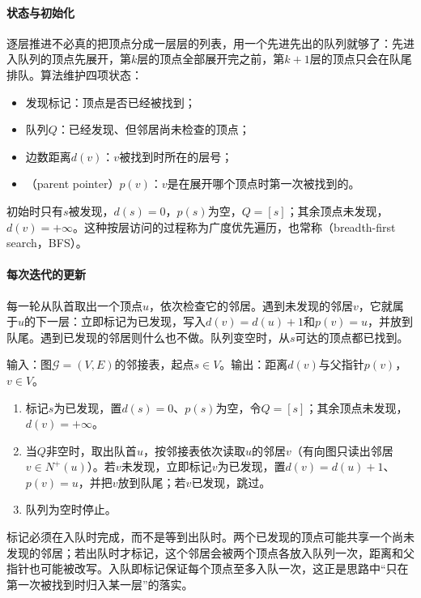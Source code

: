 \paragraph{状态与初始化}
逐层推进不必真的把顶点分成一层层的列表，用一个先进先出的队列就够了：先进入队列的顶点先展开，第$k$层的顶点全部展开完之前，第$k+1$层的顶点只会在队尾排队。算法维护四项状态：
\begin{itemize}
  \item 发现标记：顶点是否已经被找到；
  \item 队列$Q$：已经发现、但邻居尚未检查的顶点；
  \item 边数距离$d(v)$：$v$被找到时所在的层号；
  \item {}（parent pointer）$p(v)$：$v$是在展开哪个顶点时第一次被找到的。
\end{itemize}
初始时只有$s$被发现，$d(s)=0$，$p(s)$为空，$Q=[s]$；其余顶点未发现，$d(v)=+\infty$。这种按层访问的过程称为广度优先遍历，也常称（breadth-first search，BFS）。

\paragraph{每次迭代的更新}
每一轮从队首取出一个顶点$u$，依次检查它的邻居。遇到未发现的邻居$v$，它就属于$u$的下一层：立即标记为已发现，写入$d(v)=d(u)+1$和$p(v)=u$，并放到队尾。遇到已发现的邻居则什么也不做。队列变空时，从$s$可达的顶点都已找到。

\begin{algorithm}[广度优先遍历]
\label{alg:graph-trav-bfs}
输入：图$\mathcal G=(V,E)$的邻接表，起点$s\in V$。输出：距离$d(v)$与父指针$p(v)$，$v\in V$。
\begin{enumerate}
  \item 标记$s$为已发现，置$d(s)=0$、$p(s)$为空，令$Q=[s]$；其余顶点未发现，$d(v)=+\infty$。
  \item 当$Q$非空时，取出队首$u$，按邻接表依次读取$u$的邻居$v$（有向图只读出邻居$v\in N^+(u)$）。若$v$未发现，立即标记$v$为已发现，置$d(v)=d(u)+1$、$p(v)=u$，并把$v$放到队尾；若$v$已发现，跳过。
  \item 队列为空时停止。
\end{enumerate}
\end{algorithm}

标记必须在入队时完成，而不是等到出队时。两个已发现的顶点可能共享一个尚未发现的邻居；若出队时才标记，这个邻居会被两个顶点各放入队列一次，距离和父指针也可能被改写。入队即标记保证每个顶点至多入队一次，这正是思路中“只在第一次被找到时归入某一层”的落实。

